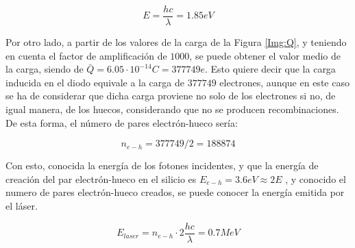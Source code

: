 \documentclass[twoside]{article}
\begin{document}
				\begin{equation}
					E = \frac{hc}{\lambda} = 1.85 eV
				\end{equation}

			Por otro lado, a partir de los valores de la carga de la Figura \ref{Img:Q}, y teniendo en cuenta el factor de amplificación de $1000$, se puede obtener el valor medio de la carga, siendo de $\bar{Q} = 6.05 \cdot 10^{-14} C = 377749 e$. Esto quiere decir que la carga inducida en el diodo equivale a la carga de $377749$ electrones, aunque en este caso se ha de considerar que dicha carga proviene no solo de los electrones si no, de igual manera, de los huecos, considerando que no se producen recombinaciones. De esta forma, el número de pares electrón-hueco sería:

				\begin{equation}
					n_{e-h} = 377749 / 2 = 188874
				\end{equation}

			Con esto, conocida la energía de los fotones incidentes, y que la energía de creación del par electrón-hueco en el silicio es $E_{e-h} = 3.6 eV \approx 2E $ \cite{nickname}, y conocido el numero de pares electrón-hueco creados, se puede conocer la energía emitida por el láser.

				\begin{equation}
					E_{laser} = n_{e-h} \cdot 2 \frac{hc}{\lambda} = 0.7 MeV
				\end{equation}


	
	
\end{document}
